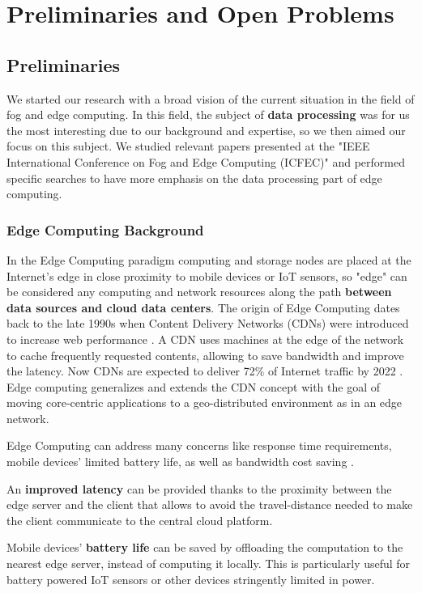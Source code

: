 \chapter{Preliminaries and Open Problems}
\label{ch:preliminaries_and_open_problems}


\section{Preliminaries}
We started our research with a broad vision of the current situation in the field of fog and edge computing. In this field, the subject of \textbf{data processing} was for us the most interesting due to our background and expertise, so we then aimed our focus on this subject. We studied relevant papers presented at the "IEEE International Conference on Fog and Edge Computing (ICFEC)" and performed specific searches to have more emphasis on the data processing part of edge computing.


\subsection{Edge Computing Background}
In the Edge Computing paradigm computing and storage nodes are placed at the Internet’s edge in close proximity to mobile devices or IoT sensors, so "edge" can be considered any computing and network resources along the path \textbf{between data sources and cloud data centers}.
The origin of Edge Computing dates back to the late 1990s when Content Delivery Networks (CDNs) were introduced to increase web performance \cite{edge-computing-origin}. A CDN uses machines at the edge of the network to cache frequently requested contents, allowing to save bandwidth and improve the latency. Now CDNs are expected to deliver 72\% of Internet traffic by 2022 \cite{cdn-usage}. Edge computing generalizes and extends the CDN concept with the goal of moving core-centric applications to a geo-distributed environment as in an edge network.

Edge Computing can address many concerns like response time requirements, mobile devices' limited battery life, as well as bandwidth cost saving \cite{emergence-edge-computing}.

An \textbf{improved latency} can be provided thanks to the proximity between the edge server and the client that allows to avoid the travel-distance needed to make the client communicate to the central cloud platform.

Mobile devices' \textbf{battery life} can be saved by offloading the computation to the nearest edge server, instead of computing it locally. This is particularly useful for battery powered IoT sensors or other devices stringently limited in power.

